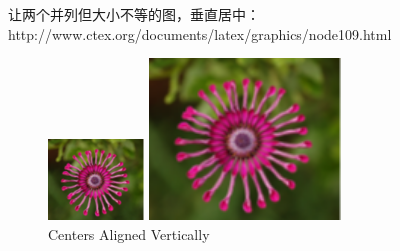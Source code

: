 \documentclass{article}
\begin{document}
\begin{CJK}{UTF8}{gbsn}
让两个并列但大小不等的图，垂直居中：http://www.ctex.org/documents/latex/graphics/node109.html
\begin{figure}[!h] 
	\centering 
	\begin{minipage}[c]{0.5\textwidth} 
		\centering 
		\includegraphics[width=1in]{imgs/flower1.png} 
	\end{minipage}%
	\begin{minipage}[c]{0.5\textwidth} 
		\centering 
		\includegraphics[width=2in]{imgs/flower1.png} 
	\end{minipage} 
	\caption{Centers Aligned Vertically} 
\end{figure}





\end{CJK}
\end{document}
